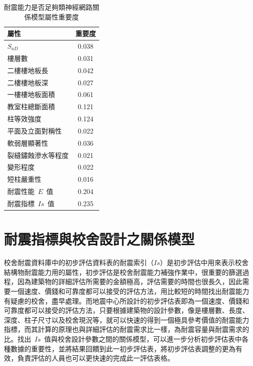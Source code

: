 {\renewcommand{\arraystretch}{1.5}
\begin{table}[hbtp]
  \begin{center}
    \caption{耐震能力是否足夠類神經網路關係模型屬性重要度}
    \label{tab:isr_result_importance}
    \footnotesize
    \begin{tabular}{l c}
      \hline
       屬性 & 重要度 \\
      \hline
       $S_{aD}$ & 0.038 \\
      \hline
       樓層數 & 0.031 \\
      \hline
       二樓樓地板長 & 0.042 \\
      \hline
       二樓樓地板深 & 0.027 \\
      \hline
       一樓樓地板面積 & 0.061 \\
      \hline
       教室柱總斷面積 & 0.121 \\
      \hline
       柱等效強度 & 0.124 \\
      \hline
       平面及立面對稱性 & 0.022 \\
      \hline
       軟弱層顯著性 & 0.036 \\
      \hline
       裂縫鏽蝕滲水等程度 & 0.021 \\
      \hline
       變形程度 & 0.022 \\
      \hline
       短柱嚴重性 & 0.016 \\
      \hline
       耐震性能~$E$~值 & 0.204 \\
      \hline
       耐震指標~$Is$~值 & 0.235 \\
      \hline
    \end{tabular}
  \end{center}
\end{table}
}













\section{耐震指標與校舍設計之關係模型}

校舍耐震資料庫中的初步評估資料表的耐震索引（$Is$）是初步評估中用來表示校舍結構物耐震能力用的屬性，初步評估是校舍耐震能力補強作業中，很重要的篩選過程，因為建築物的詳細評估所需要的金額極高，評估需要的時間也很長久，因此需要一個速度、價錢和可靠度都可以接受的評估方法，用比較短的時間找出耐震能力有疑慮的校舍，盡早處理。而地震中心所設計的初步評估表即為一個速度、價錢和可靠度都可以接受的評估方法，只要根據建築物的設計參數，像是樓層數、長度、深度、柱子尺寸以及校舍現況等，就可以快速的得到一個極具參考價值的耐震能力指標，而其計算的原理也與詳細評估的耐震需求比一樣，為耐震容量與耐震需求的比。找出~$Is$~值與校舍設計參數之間的關係模型，可以進一步分析初步評估表中各種數據的重要性，並將結果回饋到此一初步評估表，將初步評估表調整的更為有效，負責評估的人員也可以更快速的完成此一評估表格。

